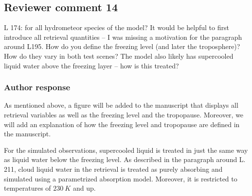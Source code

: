 \documentclass[11pt]{scrartcl}
\begin{document}
%

\subsection*{Reviewer comment 14}

L 174: for all hydrometeor species of the model? It would be helpful to first
introduce all retrieval quantities – I was missing a motivation for the
paragraph around L195. How do you define the freezing level (and later the
troposphere)? How do they vary in both test scenes? The model also likely has
supercooled liquid water above the freezing layer – how is this treated?

\subsubsection*{Author response}

As mentioned above, a figure will be added to the manuscript that displays all
retrieval variables as well as the freezing level and the tropopause. Moreover,
we will add an explanation of how the freezing level and tropopause are defined
in the manuscript.

For the simulated observations, supercooled liquid is treated in just the same
way as liquid water below the freezing level. As described in the paragraph
around L. 211, cloud liquid water in the retrieval is treated as purely
absorbing and simulated using a parametrized absorption model. Moreover, it is
restricted to temperatures of $230\ \unit{K}$ and up.
\end{document}
